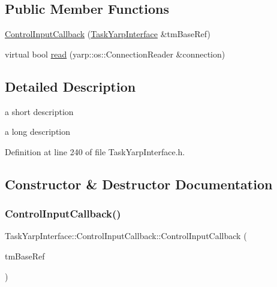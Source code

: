 \subsection*{Public Member Functions}
\begin{DoxyCompactItemize}
\item 
\hyperlink{classocra_1_1TaskYarpInterface_1_1ControlInputCallback_aab25b522726df43c6358ac435af4a502}{Control\+Input\+Callback} (\hyperlink{classocra_1_1TaskYarpInterface}{Task\+Yarp\+Interface} \&tm\+Base\+Ref)
\item 
virtual bool \hyperlink{classocra_1_1TaskYarpInterface_1_1ControlInputCallback_a6b2e8af58d4625a70ea6f8217287be07}{read} (yarp\+::os\+::\+Connection\+Reader \&connection)
\end{DoxyCompactItemize}


\subsection{Detailed Description}
a short description 

a long description 

Definition at line 240 of file Task\+Yarp\+Interface.\+h.



\subsection{Constructor \& Destructor Documentation}
\hypertarget{classocra_1_1TaskYarpInterface_1_1ControlInputCallback_aab25b522726df43c6358ac435af4a502}{}\label{classocra_1_1TaskYarpInterface_1_1ControlInputCallback_aab25b522726df43c6358ac435af4a502} 
\subsubsection{\texorpdfstring{Control\+Input\+Callback()}{ControlInputCallback()}}
{\footnotesize\ttfamily Task\+Yarp\+Interface\+::\+Control\+Input\+Callback\+::\+Control\+Input\+Callback (\begin{DoxyParamCaption}\item[{\hyperlink{classocra_1_1TaskYarpInterface}{Task\+Yarp\+Interface} \&}]{tm\+Base\+Ref }\end{DoxyParamCaption})}



